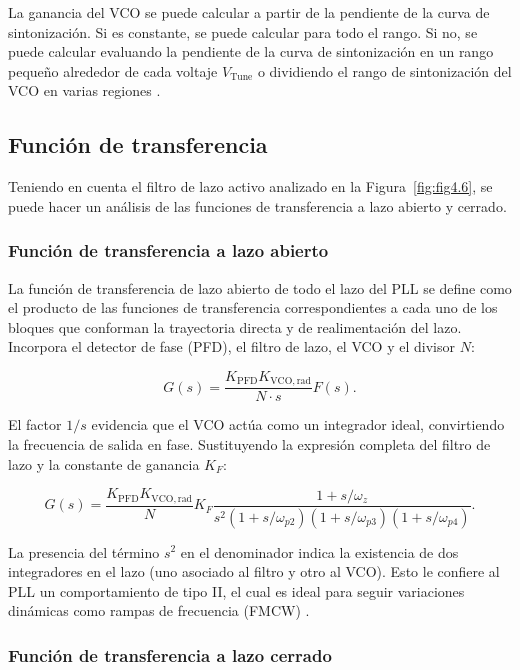 La ganancia del VCO se puede calcular a partir de la pendiente de la curva de sintonización. Si es constante, se puede calcular para todo el rango. Si no, se puede calcular evaluando la pendiente de la curva de sintonización en un rango pequeño alrededor de cada voltaje $V_{\text{Tune}}$ o dividiendo el rango de sintonización del VCO en varias regiones \cite{Dean Banerjee}.

\subsection{Función de transferencia}
Teniendo en cuenta el filtro de lazo activo analizado en la Figura~\ref{fig:fig4.6}, se puede hacer un análisis de las funciones de transferencia a lazo abierto y cerrado.

\subsubsection{Función de transferencia a lazo abierto}

La función de transferencia de lazo abierto de todo el lazo del PLL se define como el producto de las funciones de transferencia correspondientes a cada uno de los bloques que conforman la trayectoria directa y de realimentación del lazo. Incorpora el detector de fase (PFD), el filtro de lazo, el VCO y el divisor $N$:

\begin{equation}
G(s) = \frac{K_{\mathrm{PFD}} K_{\mathrm{VCO,rad}}}{N \cdot s} F(s).
\end{equation}

El factor $1/s$ evidencia que el VCO actúa como un integrador ideal, convirtiendo la frecuencia de salida en fase. Sustituyendo la expresión completa del filtro de lazo y la constante de ganancia $K_F$:

\begin{equation}
G(s) = \frac{K_{\mathrm{PFD}} K_{\mathrm{VCO,rad}}}{N} K_F \frac{1 + s/\omega_z}{s^2 \left(1 + s/\omega_{p2}\right) \left(1 + s/\omega_{p3}\right) \left(1 + s/\omega_{p4}\right)}.
\end{equation}

La presencia del término $s^2$ en el denominador indica la existencia de dos integradores en el lazo (uno asociado al filtro y otro al VCO). Esto le confiere al PLL un comportamiento de tipo II, el cual es ideal para seguir variaciones dinámicas como rampas de frecuencia (FMCW) \cite{Dean Banerjee}.

\subsubsection{Función de transferencia a lazo cerrado}

